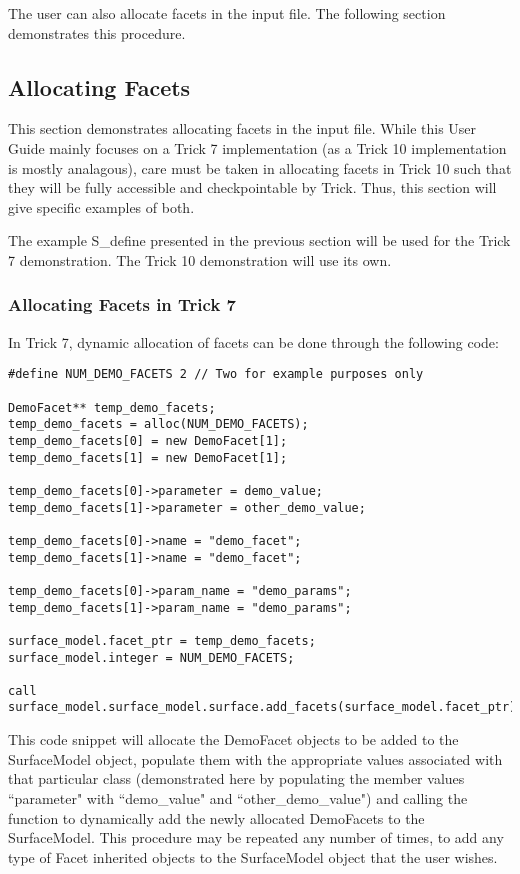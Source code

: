 The user can also allocate facets in the input file. The following
section demonstrates this procedure.

\subsection{Allocating Facets}

This section demonstrates allocating
facets in the input file. While this User Guide mainly focuses on a Trick 7
implementation (as a Trick 10 implementation is mostly analagous),
care must be taken in allocating facets in Trick 10 such that they will
be fully accessible and checkpointable by Trick. Thus, this section
will give specific examples of both.

The example S\_define presented in the previous section will
be used for the Trick 7 demonstration. The Trick 10 demonstration will
use its own.

\subsubsection{Allocating Facets in Trick 7}

In Trick 7, dynamic allocation of facets can be done
through the following code:

\begin{verbatim}
#define NUM_DEMO_FACETS 2 // Two for example purposes only

DemoFacet** temp_demo_facets;
temp_demo_facets = alloc(NUM_DEMO_FACETS);
temp_demo_facets[0] = new DemoFacet[1];
temp_demo_facets[1] = new DemoFacet[1];

temp_demo_facets[0]->parameter = demo_value;
temp_demo_facets[1]->parameter = other_demo_value;

temp_demo_facets[0]->name = "demo_facet";
temp_demo_facets[1]->name = "demo_facet";

temp_demo_facets[0]->param_name = "demo_params";
temp_demo_facets[1]->param_name = "demo_params";

surface_model.facet_ptr = temp_demo_facets;
surface_model.integer = NUM_DEMO_FACETS;

call surface_model.surface_model.surface.add_facets(surface_model.facet_ptr);
\end{verbatim}

This code snippet will allocate the DemoFacet objects to be added to
the SurfaceModel object, populate them with the appropriate values
associated with that particular class (demonstrated here by populating
the member values ``parameter" with ``demo\_value" and ``other\_demo\_value")
and calling the function to dynamically add the newly allocated DemoFacets
to the SurfaceModel. This procedure may be repeated any number of times,
to add any type of Facet inherited objects to the SurfaceModel object
that the user wishes.

